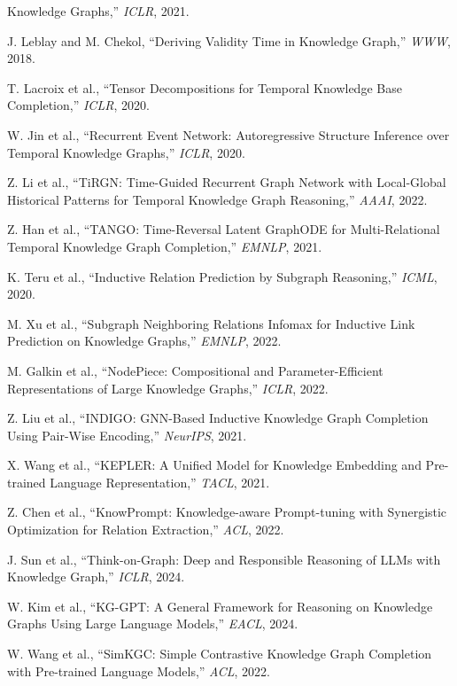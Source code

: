 \documentclass[12pt,a4paper]{article}
\begin{document}
\begin{enumerate}[leftmargin=1.5em, label={[\arabic*]}]
        Knowledge Graphs,'' \textit{ICLR}, 2021.
  \item J. Leblay and M. Chekol, ``Deriving Validity Time in Knowledge Graph,''
        \textit{WWW}, 2018.
  \item T. Lacroix et al., ``Tensor Decompositions for Temporal Knowledge
        Base Completion,'' \textit{ICLR}, 2020.
  \item W. Jin et al., ``Recurrent Event Network: Autoregressive Structure
        Inference over Temporal Knowledge Graphs,'' \textit{ICLR}, 2020.
  \item Z. Li et al., ``TiRGN: Time-Guided Recurrent Graph Network with
        Local-Global Historical Patterns for Temporal Knowledge Graph
        Reasoning,'' \textit{AAAI}, 2022.
  \item Z. Han et al., ``TANGO: Time-Reversal Latent GraphODE for
        Multi-Relational Temporal Knowledge Graph Completion,''
        \textit{EMNLP}, 2021.
  \item K. Teru et al., ``Inductive Relation Prediction by Subgraph
        Reasoning,'' \textit{ICML}, 2020.
  \item M. Xu et al., ``Subgraph Neighboring Relations Infomax for Inductive
        Link Prediction on Knowledge Graphs,'' \textit{EMNLP}, 2022.
  \item M. Galkin et al., ``NodePiece: Compositional and Parameter-Efficient
        Representations of Large Knowledge Graphs,'' \textit{ICLR}, 2022.
  \item Z. Liu et al., ``INDIGO: GNN-Based Inductive Knowledge Graph
        Completion Using Pair-Wise Encoding,'' \textit{NeurIPS}, 2021.
  \item X. Wang et al., ``KEPLER: A Unified Model for Knowledge Embedding
        and Pre-trained Language Representation,'' \textit{TACL}, 2021.
  \item Z. Chen et al., ``KnowPrompt: Knowledge-aware Prompt-tuning with
        Synergistic Optimization for Relation Extraction,'' \textit{ACL}, 2022.
  \item J. Sun et al., ``Think-on-Graph: Deep and Responsible Reasoning of
        LLMs with Knowledge Graph,'' \textit{ICLR}, 2024.
  \item W. Kim et al., ``KG-GPT: A General Framework for Reasoning on
        Knowledge Graphs Using Large Language Models,'' \textit{EACL}, 2024.
  \item W. Wang et al., ``SimKGC: Simple Contrastive Knowledge Graph
        Completion with Pre-trained Language Models,'' \textit{ACL}, 2022.

\end{enumerate}
\end{document}

